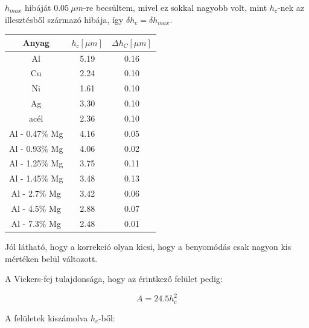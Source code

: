 \documentclass[a4paper,12pt]{article}
\begin{document}
\par $h_{max}$ hibáját $0.05 ~\mu m$-re becsültem, mivel ez sokkal nagyobb volt, mint $h_{c}$-nek az illesztésből származó hibája, így $\delta h_{c} = \delta h_{max}$.

\begin{center}
\begin{tabular}{|c|c|c|}
\hline
Anyag & $h_{c} [\mu m]$ & $\Delta h_{C} [\mu m]$ \\
\hline
Al &5.19 &0.16 \\
\hline
Cu &2.24 &0.10 \\
\hline
Ni &1.61 &0.10 \\
\hline
Ag& 3.30& 0.10\\
\hline
acél &2.36& 0.10 \\
\hline
Al - 0.47$\%$ Mg &  4.16& 0.05 \\
\hline
Al - 0.93$\%$ Mg& 4.06& 0.02 \\
\hline
Al - 1.25$\%$ Mg& 3.75& 0.11 \\
\hline
Al - 1.45$\%$ Mg &3.48& 0.13 \\
\hline
Al - 2.7$\%$ Mg &3.42& 0.06 \\
\hline
Al - 4.5$\%$ Mg &2.88& 0.07 \\
\hline
Al - 7.3$\%$ Mg &2.48& 0.01 \\
\hline
\end{tabular}
\end{center}

\par Jól látható, hogy a korrekció olyan kicsi, hogy a benyomódás csak nagyon kis mértéken belül változott.

\par A Vickers-fej tulajdonsága, hogy az érintkező felület pedig:

\begin{equation*}
A = 24.5h_{c}^{2}
\end{equation*}

\par A felületek kiszámolva $h_{c}$-ből:
\end{document}
